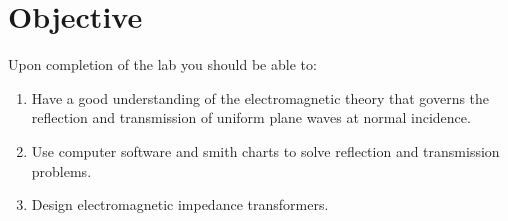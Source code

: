 \section{Objective}\label{sec:objective}
Upon completion of the lab you should be able to:

\begin{enumerate}
	\item Have a good understanding of the electromagnetic theory that governs the reflection and transmission of uniform plane waves at normal incidence. 
	\item Use computer software and smith charts to solve reflection and  transmission problems. 
	\item Design electromagnetic impedance transformers.
\end{enumerate}
